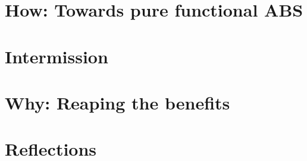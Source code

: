\documentclass[oneside]{book}
\begin{document}
\part{How: Towards pure functional ABS}




\epigraphhead[450]{}
\part{Intermission}


\epigraphhead[450]{}
\part{Why: Reaping the benefits}




%

\epigraphhead[450]{}
\part{Reflections}




\renewcommand\bibname{References}





\end{document}
